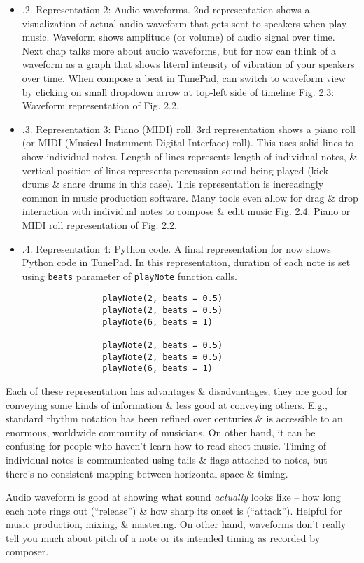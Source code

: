 \documentclass{article}
\begin{document}
\begin{itemize}
\begin{itemize}
\begin{itemize}
			\item {.2. Representation 2: Audio waveforms.} 2nd representation shows a visualization of actual audio waveform that gets sent to speakers when play music. Waveform shows amplitude (or volume) of audio signal over time. Next chap talks more about audio waveforms, but for now can think of a waveform as a graph that shows literal intensity of vibration of your speakers over time. When compose a beat in TunePad, can switch to waveform view by clicking on small dropdown arrow at top-left side of timeline {\sf Fig. 2.3: Waveform representation of Fig. 2.2}.
			\item {.3. Representation 3: Piano (MIDI) roll.} 3rd representation shows a piano roll (or MIDI (Musical Instrument Digital Interface) roll). This uses solid lines to show individual notes. Length of lines represents length of individual notes, \& vertical position of lines represents percussion sound being played (kick drums \& snare drums in this case). This representation is increasingly common in music production software. Many tools even allow for drag \& drop interaction with individual notes to compose \& edit music {\sf Fig. 2.4: Piano or MIDI roll representation of Fig. 2.2}.
			\item {.4. Representation 4: Python code.} A final representation for now shows Python code in TunePad. In this representation, duration of each note is set using {\tt beats} parameter of {\tt playNote} function calls.
			\begin{verbatim}
				playNote(2, beats = 0.5)
				playNote(2, beats = 0.5)
				playNote(6, beats = 1)
				
				playNote(2, beats = 0.5)
				playNote(2, beats = 0.5)
				playNote(6, beats = 1)
			\end{verbatim}
		\end{itemize}
		Each of these representation has advantages \& disadvantages; they are good for conveying some kinds of information \& less good at conveying others. E.g., standard rhythm notation has been refined over centuries \& is accessible to an enormous, worldwide community of musicians. On other hand, it can be confusing for people who haven't learn how to read sheet music. Timing of individual notes is communicated using tails \& flags attached to notes, but there's no consistent mapping between horizontal space \& timing.
		
		Audio waveform is good at showing what sound {\it actually} looks like -- how long each note rings out (``release'') \& how sharp its onset is (``attack''). Helpful for music production, mixing, \& mastering. On other hand, waveforms don't really tell you much about pitch of a note or its intended timing as recorded by composer.
		

\end{itemize}
\end{itemize}
\end{document}
